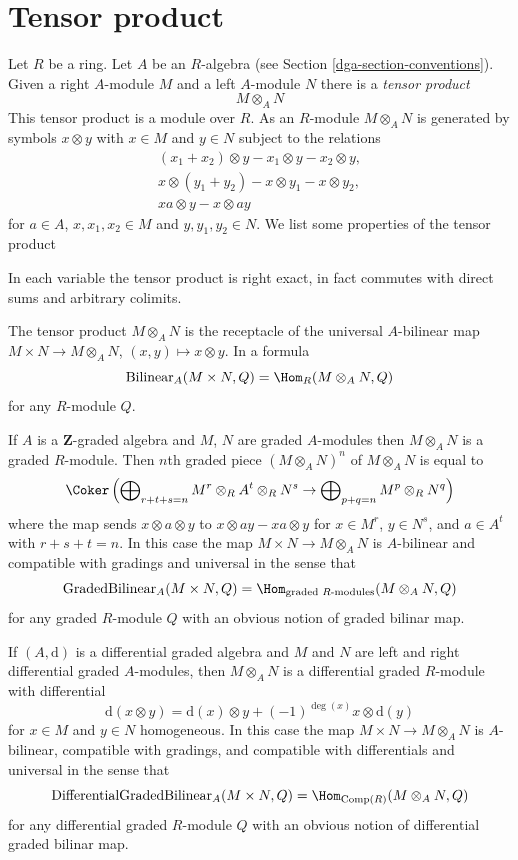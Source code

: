 \section{Tensor product}
\label{dga-section-tensor-product}
Let $R$ be a ring. Let $A$ be an $R$-algebra (see
Section \ref{dga-section-conventions}). Given a right $A$-module $M$
and a left $A$-module $N$ there is a {\it tensor product}
$$
M \otimes_A N
$$
This tensor product is a module over $R$. As an $R$-module $M \otimes_A N$
is generated by symbols $x \otimes y$ with $x \in M$ and $y \in N$ subject
to the relations
$$
\begin{matrix}
(x_1 + x_2) \otimes y - x_1 \otimes y - x_2 \otimes y, \\
x \otimes (y_1 + y_2) - x \otimes y_1 - x \otimes y_2, \\
xa \otimes y - x \otimes ay
\end{matrix}
$$
for $a \in A$, $x, x_1, x_2 \in M$ and $y, y_1, y_2 \in N$.
We list some properties of the tensor product

\medskip\noindent
In each variable the tensor product is right exact, in fact commutes
with direct sums and arbitrary colimits.

\medskip\noindent
The tensor product $M \otimes_A N$ is the receptacle of the universal
$A$-bilinear map $M \times N \to M \otimes_A N$, $(x, y) \mapsto x \otimes y$.
In a formula
$$
\text{Bilinear}_A(M \times N, Q) = \Hom_R(M \otimes_A N, Q)
$$
for any $R$-module $Q$.

\medskip\noindent
If $A$ is a $\mathbf{Z}$-graded algebra and $M$, $N$ are graded
$A$-modules then $M \otimes_A N$ is a graded $R$-module.
Then $n$th graded piece $(M \otimes_A N)^n$ of $M \otimes_A N$
is equal to
$$
\Coker\left(
\bigoplus\nolimits_{r + t + s = n}
M^r \otimes_R A^t \otimes_R N^s \to
\bigoplus\nolimits_{p + q = n} M^p \otimes_R N^q
\right)
$$
where the map sends $x \otimes a \otimes y$ to
$x \otimes ay - xa \otimes y$ for
$x \in M^r$, $y \in N^s$, and $a \in A^t$ with $r + s + t = n$.
In this case the map $M \times N \to M \otimes_A N$ is $A$-bilinear
and compatible with gradings and universal in the sense that
$$
\text{GradedBilinear}_A(M \times N, Q) =
\Hom_{\text{graded }R\text{-modules}}(M \otimes_A N, Q)
$$
for any graded $R$-module $Q$ with an obvious notion of graded
bilinar map.

\medskip\noindent
If $(A, \text{d})$ is a differential graded algebra and
$M$ and $N$ are left and right differential graded $A$-modules, then
$M \otimes_A N$ is a differential graded $R$-module with differential
$$
\text{d}(x \otimes y) =
\text{d}(x) \otimes y + (-1)^{\deg(x)}x \otimes \text{d}(y)
$$
for $x \in M$ and $y \in N$ homogeneous. In this case the map
$M \times N \to M \otimes_A N$ is $A$-bilinear, compatible with gradings,
and compatible with differentials and universal in the sense that
$$
\text{DifferentialGradedBilinear}_A(M \times N, Q) =
\Hom_{\text{Comp}(R)}(M \otimes_A N, Q)
$$
for any differential graded $R$-module $Q$ with an obvious notion of
differential graded bilinar map.

